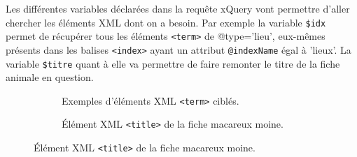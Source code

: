 \documentclass[a4paper,12pt,twoside]{book}
\begin{document}
    Les différentes variables déclarées dans la requête xQuery vont permettre d'aller chercher les éléments XML dont on a besoin. Par exemple la variable \texttt{\$idx} permet de récupérer tous les éléments \texttt{<term>} de @type='lieu', eux-mêmes présents dans les balises \texttt{<index>} ayant un attribut \texttt{@indexName} égal à 'lieux'. La variable \texttt{\$titre} quant à elle va permettre de faire remonter le titre de la fiche animale en question.
    
    
    \begin{figure}[H]
  \centering
  \begin{subfigure}[b]{0.3\linewidth}
    \caption{Exemples d'éléments XML \texttt{<term>} ciblés.}
  \end{subfigure}
  \begin{subfigure}[b]{0.4\linewidth}
    \caption{Élément XML \texttt{<title>} de la fiche macareux moine.}
  \end{subfigure}
\end{figure}
\end{document}
